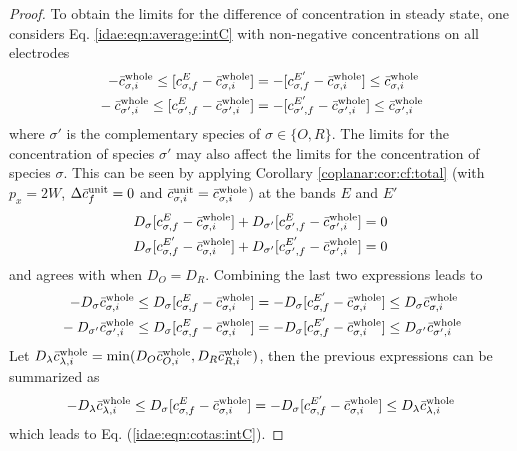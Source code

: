 \begin{proof}
	To obtain the limits for the difference of concentration in steady state,
	one considers Eq. \eqref{idae:eqn:average:intC} with non-negative concentrations on all electrodes
	\begin{subequations}
		\begin{align}
			-\bar{c}_{\sigma,i}^{\text{whole}} \leq [c_{\sigma,f}^{E} - \bar{c}_{\sigma,i}^{\text{whole}}]
			&= -[c_{\sigma,f}^{E'} - \bar{c}_{\sigma,i}^{\text{whole}}] \leq \bar{c}_{\sigma,i}^{\text{whole}}
			\\ {}
			-\bar{c}_{\sigma',i}^{\text{whole}} \leq [c_{\sigma',f}^{E} - \bar{c}_{\sigma',i}^{\text{whole}}]
			&= -[c_{\sigma',f}^{E'} - \bar{c}_{\sigma',i}^{\text{whole}}] \leq \bar{c}_{\sigma',i}^{\text{whole}}
		\end{align}
	\end{subequations}
	where $\sigma'$ is the complementary species of $\sigma \in \{O,R\}$.
	The limits for the concentration of species $\sigma'$
	may also affect the limits for the concentration of species $\sigma$.
	This can be seen by applying Corollary \ref{coplanar:cor:cf:total}
	(with $p_{x} = 2W$, $\Delta\bar{c}_{f}^{\text{unit}} = 0$
	and $\bar{c}_{\sigma,i}^{\text{unit}} = \bar{c}_{\sigma,i}^{\text{whole}}$)
	at the bands $E$ and $E'$
	\begin{subequations}
		\label{idae:eqn:cf:unit:total}
		\begin{align}
			D_{\sigma} [c_{\sigma,f}^{E} - \bar{c}_{\sigma,i}^{\text{whole}}]
			+ D_{\sigma'} [c_{\sigma',f}^{E} - \bar{c}_{\sigma',i}^{\text{whole}}] &= 0
			\\
			D_{\sigma} [c_{\sigma,f}^{E'} - \bar{c}_{\sigma,i}^{\text{whole}}]
			+ D_{\sigma'} [c_{\sigma',f}^{E'} - \bar{c}_{\sigma',i}^{\text{whole}}] &= 0
		\end{align}
	\end{subequations}
	and agrees with \cite[Eqs. (15) and (16)]{Morf:2006:may} when $D_{O} = D_{R}$.
	Combining the last two expressions leads to
	\begin{subequations}
		\begin{align}
			-D_{\sigma} \bar{c}_{\sigma,i}^{\text{whole}}
			\leq D_{\sigma} [c_{\sigma,f}^{E} - \bar{c}_{\sigma,i}^{\text{whole}}]
			&= -D_{\sigma} [c_{\sigma,f}^{E'} - \bar{c}_{\sigma,i}^{\text{whole}}]
			\leq D_{\sigma} \bar{c}_{\sigma,i}^{\text{whole}}
			\\ {}
			-D_{\sigma'} \bar{c}_{\sigma',i}^{\text{whole}}
			\leq D_{\sigma} [c_{\sigma,f}^{E} - \bar{c}_{\sigma,i}^{\text{whole}}]
			&= -D_{\sigma} [c_{\sigma,f}^{E'} - \bar{c}_{\sigma,i}^{\text{whole}}]
			\leq D_{\sigma'} \bar{c}_{\sigma',i}^{\text{whole}}
		\end{align}
	\end{subequations}
	Let $D_{\lambda} \bar{c}_{\lambda,i}^{\text{whole}} = \min(D_{O} \bar{c}_{O,i}^{\text{whole}}, D_{R} \bar{c}_{R,i}^{\text{whole}})$,
	then the previous expressions can be summarized as
	\begin{equation}
		-D_{\lambda} \bar{c}_{\lambda,i}^{\text{whole}}
		\leq D_{\sigma} [c_{\sigma,f}^{E} - \bar{c}_{\sigma,i}^{\text{whole}}]
		= -D_{\sigma} [c_{\sigma,f}^{E'} - \bar{c}_{\sigma,i}^{\text{whole}}]
		\leq D_{\lambda} \bar{c}_{\lambda,i}^{\text{whole}}
	\end{equation}
	which leads to Eq. (\ref{idae:eqn:cotas:intC}).
\end{proof}

